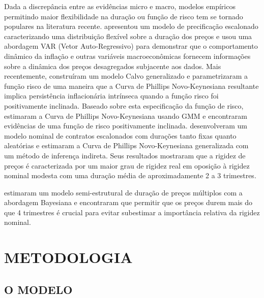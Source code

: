 \documentclass[twoside,a4paper,11pt]{report}
\begin{document}
Dada a discrepância entre as evidências micro e macro, modelos empíricos permitindo maior flexibilidade na duração ou função de risco tem se tornado populares na literatura recente. \citet{jadresic1999sticky} apresentou um modelo de precificação escalonado caracterizando uma distribuição flexível sobre a duração dos preços e usou uma abordagem VAR (Vetor Auto-Regressivo) para demonstrar que o comportamento dinâmico da inflação e outras variáveis macroeconômicas fornecem informações sobre a dinâmica dos preços desagregados subjacente aos dados. Mais recentemente, \citet{sheedy2007inflation} construíram um modelo Calvo generalizado e parametrizaram a função risco de uma maneira que a Curva de Phillips Novo-Keynesiana resultante implica persistência inflacionária intrínseca quando a função risco foi positivamente inclinada. Baseado sobre esta especificação da função de risco, estimaram a Curva de Phillips Novo-Keynesiana usando GMM e encontraram evidências de uma função de risco positivamente inclinada. \citet{coenen2007identifying} desenvolveram um modelo nominal de contratos escalonados com durações tanto fixas quanto aleatórias e estimaram a Curva de Phillips Novo-Keynesiana generalizada com um método de inferença indireta. Seus resultados mostraram que a rigidez de preços é caracterizada por um maior grau de rigidez real em oposição à rigidez nominal modesta com uma duração média de aproximadamente 2 a 3 trimestres. 

\citet{carvalho2009estimating} estimaram um modelo semi-estrutural de duração de preços múltiplos com a abordagem Bayesiana e encontraram que permitir que os preços durem mais do que 4 trimestres é crucial para evitar subestimar a importância relativa da rigidez nominal.


\pagestyle{empty}
\cleardoublepage
\pagestyle{fancy}

\chapter{METODOLOGIA}\label{cap3en02}

\section*{O MODELO}
\end{document}
